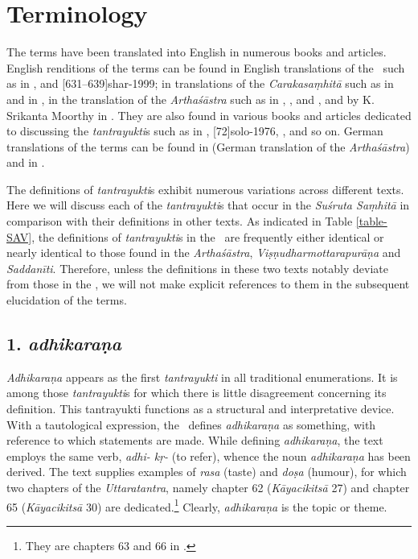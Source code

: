 \section{Terminology}

\label{tantra-trans}
The terms have been translated into English in numerous books and articles. English renditions of the terms can be found in English translations of the \SS\ such as in \cite[171--172]{sing-1980}, and [631--639]{shar-1999}; in translations of the \emph{Carakasaṃhitā} such as in \cite[436--444]{shar-2006} and in \cite[1050]{gula-1949}, in the translation of the \emph{Arthaśāstra} such as in \cite[459]{sham-1951}, \cite[593]{kang-1969}, \cite[1103]{unni-2006} and \cite[]{oliv-2013}, and by K. Srikanta Moorthy in \cite[Appendix xi--xxxiv]{muth-1976}. They are also found in various books and articles dedicated to discussing the \emph{tantrayukti}s such as in \cite[601--602]{ober-1968}, [72]{solo-1976}, \cite[34--155]{lele-1981}, \citeyear[36--150]{lele-2006} and so on. German translations of the terms can be found in \cite[663--664]{meye-1926} (German translation of the \emph{Arthaśāstra}) and in \cite{pret-1991}.


The definitions of \emph{tantrayukti}s exhibit numerous variations across different texts. Here we will discuss each of the \emph{tantrayukti}s that occur in the \emph{Suśruta Saṃhitā} in comparison with their definitions in other texts. As indicated in Table \ref{table-SAV}, the definitions of \emph{tantrayukti}s in the \SS\ are frequently either identical or nearly identical to those found in the \emph{Arthaśāstra}, \emph{Viṣṇudharmottarapurāṇa} and \emph{Saddanīti}. Therefore, unless the definitions in these two texts notably deviate from those in the \SS, we will not make explicit references to them in the subsequent elucidation of the terms. 


\subsection{1. \emph{adhikaraṇa}}

\emph{Adhikaraṇa} appears as the first \emph{tantrayukti} in all traditional 
enumerations. It is among those \emph{tantrayukti}s for which there is little 
disagreement concerning its definition. This tantrayukti functions as a 
structural and interpretative device. With a tautological expression, the \SS\ 
defines \emph{adhikaraṇa} as something, with reference to which statements 
are made. While defining \emph{adhikaraṇa}, the text employs the same verb, 
\emph{adhi- kṛ-} (to refer), whence the noun \emph{adhikaraṇa} has been 
derived. The text supplies examples of \emph{rasa} (taste) and \emph{doṣa} 
(humour), for which two chapters of the \emph{Uttaratantra}, namely chapter 
62 (\emph{Kāyacikitsā} 27) and  chapter 65 (\emph{Kāyacikitsā} 30) are 
dedicated.\footnote{They are chapters 63 and 66 in \Su{A}{B}.} Clearly, 
\emph{adhikaraṇa} is the topic or theme. 

